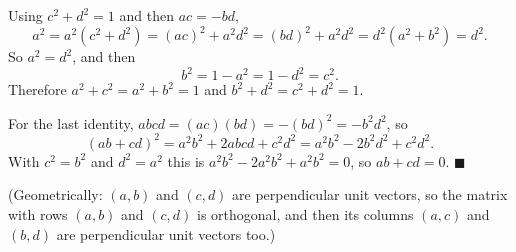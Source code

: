 Using $c^2+d^2=1$ and then $ac=-bd$,
\[
a^2=a^2(c^2+d^2)=(ac)^2+a^2d^2=(bd)^2+a^2d^2=d^2(a^2+b^2)=d^2 .
\]
So $a^2=d^2$, and then
\[
b^2=1-a^2=1-d^2=c^2 .
\]
Therefore $a^2+c^2=a^2+b^2=1$ and $b^2+d^2=c^2+d^2=1$.

For the last identity, $abcd=(ac)(bd)=-(bd)^2=-b^2d^2$, so
\[
(ab+cd)^2=a^2b^2+2abcd+c^2d^2=a^2b^2-2b^2d^2+c^2d^2 .
\]
With $c^2=b^2$ and $d^2=a^2$ this is $a^2b^2-2a^2b^2+a^2b^2=0$, so $ab+cd=0$. $\blacksquare$

(Geometrically: $(a,b)$ and $(c,d)$ are perpendicular unit vectors, so the matrix with rows $(a,b)$ and $(c,d)$ is orthogonal, and then its columns $(a,c)$ and $(b,d)$ are perpendicular unit vectors too.)
